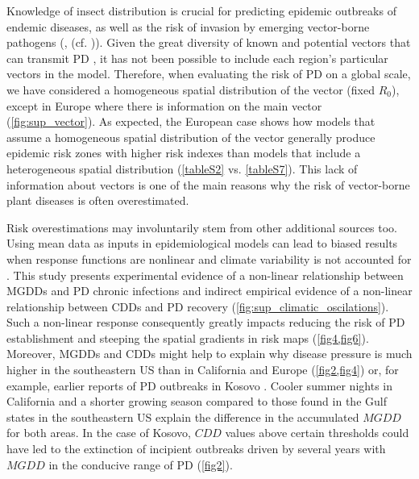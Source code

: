     Knowledge of insect distribution is crucial for predicting epidemic
    outbreaks of endemic diseases, as well as the risk of invasion by emerging
    vector-borne pathogens (\cite {Caminade2017,Jeger2019}, (cf.
    \cite{Schneider2020})). Given the great diversity of known and potential
    vectors that can transmit PD \cite{Redak2004}, it has not been possible to
    include each region's particular vectors in the model. Therefore, when
    evaluating the risk of PD on a global scale, we have considered a
    homogeneous spatial distribution of the vector (fixed $ R_0 $), except in
    Europe where there is information on the main vector
    (\cref{fig:sup_vector}). As expected, the European case shows how models
    that assume a homogeneous spatial distribution of the vector generally
    produce epidemic risk zones with higher risk indexes than models that
    include a heterogeneous spatial distribution (\cref{tableS2} vs.
    \cref{tableS7}). This lack of information about vectors is one of the main
    reasons why the risk of vector-borne plant diseases is often overestimated.

    Risk overestimations may involuntarily stem from other additional sources
    too. Using mean data as inputs in epidemiological models can lead to biased
    results when response functions are nonlinear and climate variability is
    not accounted for \cite{Scherm1994}. This study presents experimental
    evidence of a non-linear relationship between MGDDs and PD chronic
    infections and indirect empirical evidence of a non-linear relationship
    between CDDs and PD recovery (\cref{fig:sup_climatic_oscilations}). Such a
    non-linear response consequently greatly impacts reducing the risk of PD
    establishment and steeping the spatial gradients in risk maps
    (\cref{fig4,fig6}). Moreover, MGDDs and CDDs might help to explain why
    disease pressure is much higher in the southeastern US than in California
    and Europe (\cref{fig2,fig4}) or, for example, earlier reports of PD
    outbreaks in Kosovo  \cite{Berisha1998}. Cooler summer nights in California
    and a shorter growing season compared to those found in the Gulf states in
    the southeastern US explain the difference in the accumulated $MGDD$ for
    both areas. In the case of Kosovo, $CDD$ values above certain thresholds
    could have led to the extinction of incipient outbreaks driven by several
    years with $MGDD$ in the conducive range of PD (\cref{fig2}).

